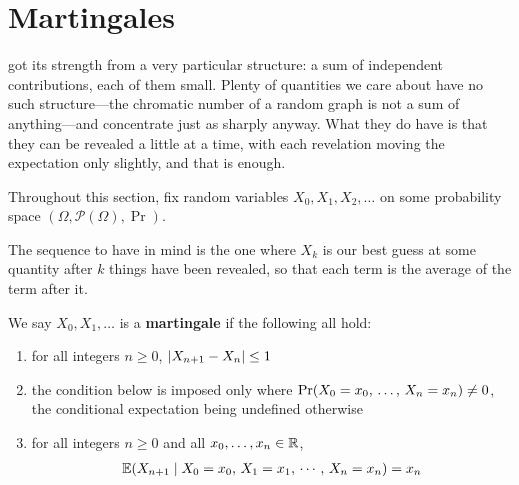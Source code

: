 \section{Martingales} \label{Ch4:Sec:Martingales}

 got its strength from a very particular structure: a sum of independent contributions, each of them small. Plenty of quantities we care about have no such structure---the chromatic number of a random graph is not a sum of anything---and concentrate just as sharply anyway. What they do have is that they can be revealed a little at a time, with each revelation moving the expectation only slightly, and that is enough.

Throughout this section, fix random variables $X_0, X_1, X_2, \ldots$ on some probability space $(\Omega, \mathcal{P}(\Omega), \Pr)$.

The sequence to have in mind is the one where $X_k$ is our best guess at some quantity after $k$ things have been revealed, so that each term is the average of the term after it.

\begin{boxdefinition}[Martingale] \label{Ch4:Def:Martingale}
    We say $X_0, X_1, \ldots$ is a \textbf{martingale} if the following all hold:
    \begin{enumerate}
        \item for all integers $n \geq 0$, $\left\lvert X_{n+1} - X_n \right\rvert \leq 1$
        \item the condition below is imposed only where $\Pr\!\left( X_0 = x_0, \, \ldots, \, X_n = x_n \right) \neq 0$, the conditional expectation being undefined otherwise
        \item for all integers $n \geq 0$ and all $x_0, \ldots, x_n \in \mathbb{R}$,
        \begin{align*}
            \mathbb{E}\!\left( X_{n + 1} \mid X_0 = x_0, \, X_1 = x_1, \, \cdots, \, X_n = x_n \right) = x_n
        \end{align*}
    \end{enumerate}
\end{boxdefinition}

